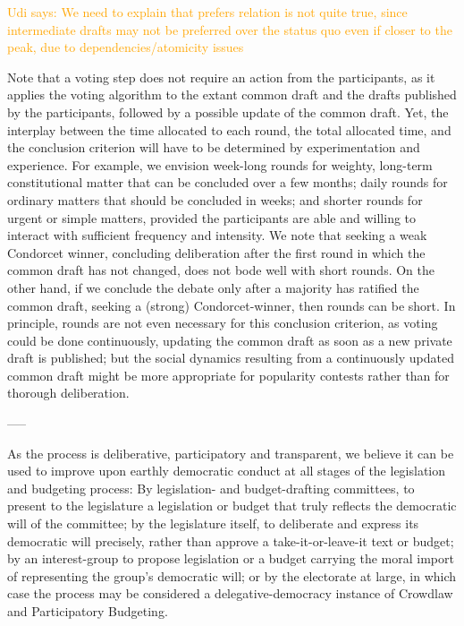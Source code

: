 \documentclass[sigconf]{aamas}  %
\newcommand{\udi}[1]{\textcolor{orange}{Udi says: #1}}
\begin{document}
\udi{We need to explain that prefers relation is not quite true, since intermediate drafts may not be preferred over the status quo even if closer to the peak, due to dependencies/atomicity issues}

Note that a voting step does not require an action from the participants, as it applies the voting algorithm to the extant common draft and the drafts published by the participants, followed by a possible update of the common draft. Yet, the interplay between the time allocated to each round, the total allocated time, and the conclusion criterion will have to be determined by experimentation and experience.  For example, we envision week-long rounds for weighty, long-term constitutional matter that can be concluded over a few months; daily rounds for ordinary matters that should be concluded in weeks; and shorter rounds for urgent or simple matters, provided the participants are able and willing to interact with sufficient frequency and intensity.  We note that seeking a weak Condorcet winner, concluding deliberation after the first round in which the common draft has not changed, does not bode well with short rounds.  On the other hand, if we conclude the debate only after a majority has ratified the common draft, seeking a (strong) Condorcet-winner, then rounds can be short. In principle, rounds are not even necessary for this conclusion criterion, as voting could be done continuously, updating the common draft as soon as a new private draft is published; but the social dynamics resulting from a continuously updated common draft might be more appropriate for popularity contests rather than for thorough deliberation. 




-----

As the process is deliberative, participatory and transparent, we believe it can be used to improve upon earthly democratic conduct at all stages of the legislation and budgeting process: By  legislation- and budget-drafting committees, to present to the legislature a legislation or budget that truly reflects the democratic will of the committee; by the legislature itself, to deliberate and express its democratic will precisely, rather than approve a take-it-or-leave-it text or budget;
by an interest-group to propose legislation or a budget carrying the moral import of representing the group's democratic will; or by the electorate at large, in which case the process may be considered a delegative-democracy instance of Crowdlaw and Participatory Budgeting.
\end{document}
